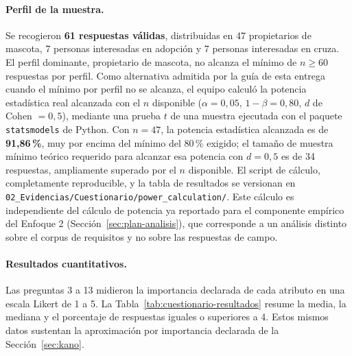 \documentclass[journal,onecolumn]{IEEEtran}
\begin{document}
	\paragraph{Perfil de la muestra.}
	Se recogieron \textbf{61 respuestas válidas}, distribuidas en 47 propietarios
	de mascota, 7 personas interesadas en adopción y 7 personas interesadas en
	cruza. El perfil dominante, propietario de mascota, no alcanza el mínimo
	de $n \geq 60$ respuestas por perfil. Como alternativa admitida por la
	guía de esta entrega cuando el mínimo por perfil no se alcanza, el equipo
	calculó la potencia estadística real alcanzada con el $n$ disponible
	($\alpha = 0{,}05$, $1 - \beta = 0{,}80$, $d$ de Cohen $= 0{,}5$),
	mediante una prueba $t$ de una muestra ejecutada con el paquete
	\texttt{statsmodels} de Python. Con $n = 47$, la potencia estadística
	alcanzada es de \textbf{91,86\,\%}, muy por encima del mínimo del
	80\,\% exigido; el tamaño de muestra mínimo teórico requerido para
	alcanzar esa potencia con $d = 0{,}5$ es de 34 respuestas, ampliamente
	superado por el $n$ disponible. El script de cálculo, completamente
	reproducible, y la tabla de resultados se versionan en
	\texttt{02\_Evidencias/Cuestionario/power\_calculation/}. Este cálculo
	es independiente del cálculo de potencia ya reportado para el
	componente empírico del Enfoque 2 (Sección~\ref{sec:plan-analisis}), que
	corresponde a un análisis distinto sobre el corpus de requisitos y no
	sobre las respuestas de campo.
	
	\paragraph{Resultados cuantitativos.}
	Las preguntas 3 a 13 midieron la importancia declarada de cada atributo en
	una escala Likert de 1 a 5. La Tabla~\ref{tab:cuestionario-resultados}
	resume la media, la mediana y el porcentaje de respuestas iguales o
	superiores a 4. Estos mismos datos sustentan la aproximación por importancia
	declarada de la Sección~\ref{sec:kano}.
	
\end{document}

